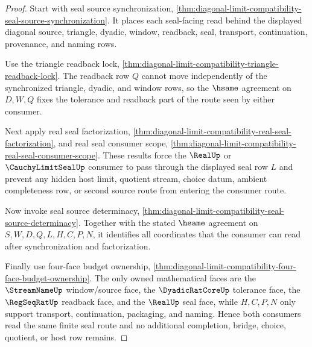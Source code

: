 \begin{proof}
Start with seal source synchronization,
\autoref{thm:diagonal-limit-compatibility-seal-source-synchronization}. It
places each seal-facing read behind the displayed diagonal source, triangle,
dyadic, window, readback, seal, transport, continuation, provenance, and naming
rows.

Use the triangle readback lock,
\autoref{thm:diagonal-limit-compatibility-triangle-readback-lock}. The readback
row $Q$ cannot move independently of the synchronized triangle, dyadic, and
window rows, so the $\hsame$ agreement on $D,W,Q$ fixes the tolerance and
readback part of the route seen by either consumer.

Next apply real seal factorization,
\autoref{thm:diagonal-limit-compatibility-real-seal-factorization}, and real
seal consumer scope,
\autoref{thm:diagonal-limit-compatibility-real-seal-consumer-scope}. These
results force the $\RealUp$ or $\CauchyLimitSealUp$ consumer to pass through the
displayed seal row $L$ and prevent any hidden host limit, quotient stream,
choice datum, ambient completeness row, or second source route from entering the
consumer route.

Now invoke seal source determinacy,
\autoref{thm:diagonal-limit-compatibility-seal-source-determinacy}. Together
with the stated $\hsame$ agreement on $S,W,D,Q,L,H,C,P,N$, it identifies all
coordinates that the consumer can read after synchronization and factorization.

Finally use four-face budget ownership,
\autoref{thm:diagonal-limit-compatibility-four-face-budget-ownership}. The only
owned mathematical faces are the $\StreamNameUp$ window/source face, the
$\DyadicRatCoreUp$ tolerance face, the $\RegSeqRatUp$ readback face, and the
$\RealUp$ seal face, while $H,C,P,N$ only support transport, continuation,
packaging, and naming. Hence both consumers read the same finite seal route and
no additional completion, bridge, choice, quotient, or host row remains.
\end{proof}


